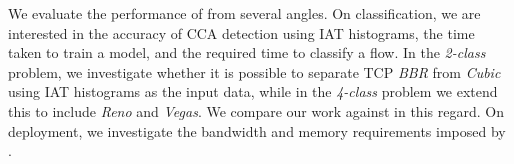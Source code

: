 
We evaluate the performance of \seidr{} from several angles.
On classification, we are interested in the accuracy of CCA detection using IAT histograms, the time taken to train a model, and the required time to classify a flow.
In the \emph{2-class} problem, we investigate whether it is possible to separate TCP \emph{BBR} from \emph{Cubic} using IAT histograms as the input data, while in the \emph{4-class} problem we extend this to include \emph{Reno} and \emph{Vegas}.
We compare our work against \textcite{DBLP:conf/icccn/HagosEYK18} in this regard.
On deployment, we investigate the bandwidth and memory requirements imposed by \seidr{}.




